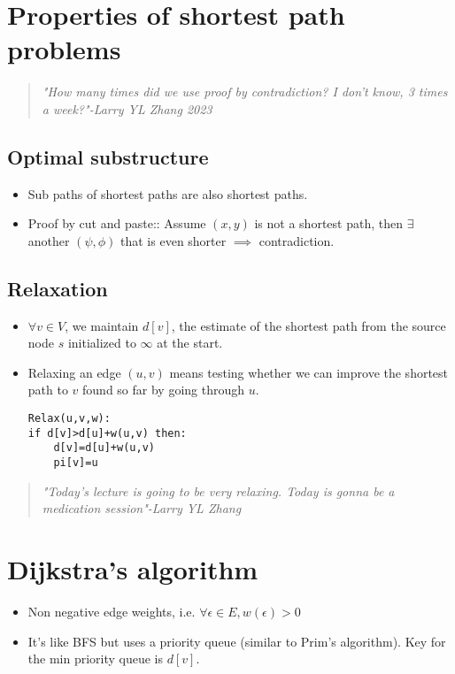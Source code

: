 \documentclass[12pt]{book}
\begin{document}
\section*{Properties of shortest path problems}

\begin{quote}
    \textit{"How many times did we use proof by contradiction? I don't know, 3 times a week?"-Larry YL Zhang 2023}
\end{quote}
\subsection*{Optimal substructure}
\begin{itemize}
    \item Sub paths of shortest paths are also shortest paths.
    \item Proof by cut and paste:: Assume $(x,y)$ is not a shortest path, then $\exists$ another $(\psi, \phi)$ that is even shorter $\implies$ contradiction.
\end{itemize}

\subsection*{Relaxation}
\begin{itemize}
    \item $\forall v\in V$, we maintain $d[v]$, the estimate of the shortest path from the source node $s$ initialized to $\infty$ at the start.
    \item Relaxing an edge $(u,v)$ means testing whether we can improve the shortest path to $v$ found so far by going through $u$.
    
    \begin{lstlisting}
Relax(u,v,w):
if d[v]>d[u]+w(u,v) then:
    d[v]=d[u]+w(u,v)
    pi[v]=u
    \end{lstlisting}
\end{itemize}

\begin{quote}
    \textit{"Today's lecture is going to be very relaxing. Today is gonna be a medication session"-Larry YL Zhang}
\end{quote}

\section*{Dijkstra's algorithm}

\begin{itemize}
    \item Non negative edge weights, i.e. $\forall \epsilon \in E, w(\epsilon)>0$
    \item It's like BFS but uses a priority queue (similar to Prim's algorithm). Key for the min priority queue is $d[v]$.
\end{itemize}
\end{document}
